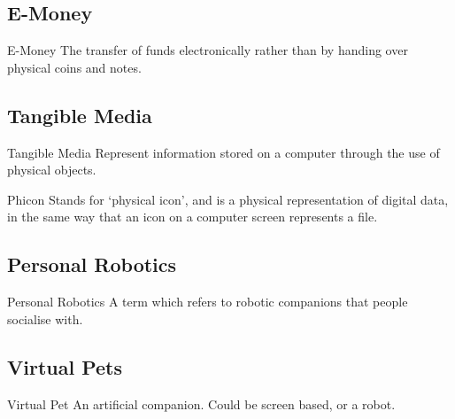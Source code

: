 \documentclass[\main/notes.tex]{subfiles}
\begin{document}
			\subsection{E-Money}
				\begin{definition}{E-Money}
					The transfer of funds electronically rather than by handing over physical coins and notes.
				\end{definition}
			\subsection{Tangible Media}
				\begin{definition}{Tangible Media}
					Represent information stored on a computer through the use of physical objects.
				\end{definition}
				\begin{definition}{Phicon}
					Stands for `physical icon', and is a physical representation of digital data, in the same way that an icon on a computer screen represents a file.
				\end{definition}
			\subsection{Personal Robotics}
				\begin{definition}{Personal Robotics}
					A term which refers to robotic companions that people socialise with.
				\end{definition}
			\subsection{Virtual Pets}
				\begin{definition}{Virtual Pet}
					An artificial companion. Could be screen based, or a robot.
				\end{definition}
	\vbox{}
\end{document}
